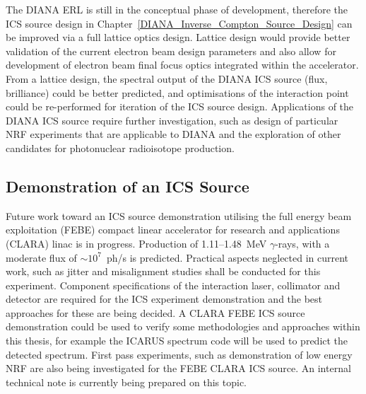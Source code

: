 \documentclass[../main.tex]{subfiles}
\begin{document}
The DIANA ERL is still in the conceptual phase of development, therefore the ICS source design in Chapter~\ref{DIANA_Inverse_Compton_Source_Design} can be improved via a full lattice optics design. Lattice design would provide better validation of the current electron beam design parameters and also allow for development of electron beam final focus optics integrated within the accelerator. From a lattice design, the spectral output of the DIANA ICS source (flux, brilliance) could be better predicted, and optimisations of the interaction point could be re-performed for iteration of the ICS source design. Applications of the DIANA ICS source require further investigation, such as design of particular NRF experiments that are applicable to DIANA and the exploration of other candidates for photonuclear radioisotope production.     

\subsection{Demonstration of an ICS Source}
Future work toward an ICS source demonstration utilising the full energy beam exploitation (FEBE) compact linear accelerator for research and applications (CLARA) linac \cite{angal2020design} is in progress. Production of 1.11--1.48~\si{\mega\electronvolt} $\gamma$-rays, with a moderate flux of $\sim 10^{7}$~ph/\si{\second} is predicted. Practical aspects neglected in current work, such as jitter and misalignment studies shall be conducted for this experiment. Component specifications of the interaction laser, collimator and detector are required for the ICS experiment demonstration and the best approaches for these are being decided. A CLARA FEBE ICS source demonstration could be used to verify some methodologies and approaches within this thesis, for example the \textsc{ICARUS} spectrum code will be used to predict the detected spectrum. First pass experiments, such as demonstration of low energy NRF are also being investigated for the FEBE CLARA ICS source. An internal technical note is currently being prepared on this topic.
\end{document}
